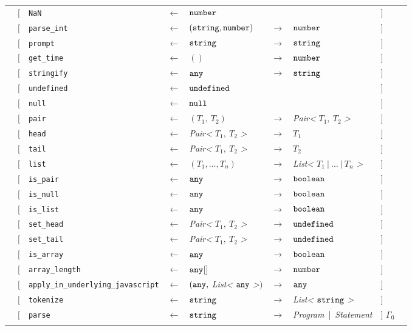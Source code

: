 \begin{tabular}[fragile]{lllllllll}
& $[$ & \texttt{NaN} & $\leftarrow$  & $\texttt{number}$ & & & $]$ \\
& $[$ & \texttt{parse\_int} & $\leftarrow$  & $(\texttt{string}, \texttt{number})$ & $\rightarrow$ & $\texttt{number}$ & $]$ \\
& $[$ & \texttt{prompt} & $\leftarrow$  & $\texttt{string}$ & $\rightarrow$ & $\texttt{string}$ & $]$ \\
& $[$ & \texttt{get\_time} & $\leftarrow$  & $()$ & $\rightarrow$ & $\texttt{number}$ & $]$ \\
& $[$ & \texttt{stringify} & $\leftarrow$  & $\texttt{any}$ & $\rightarrow$ & $\texttt{string}$ & $]$ \\
& $[$ & \texttt{undefined} & $\leftarrow$  & $\texttt{undefined}$ & & & $]$ \\
& $[$ & \texttt{null}      & $\leftarrow$  & $\texttt{null}$ & & & $]$ \\
& $[$ & \texttt{pair} & $\leftarrow$  & $(T_1,\ T_2)$ & $\rightarrow$ & \textit{Pair<} $T_1,\ T_2$ \textit{>} & $]$ \\
& $[$ & \texttt{head} & $\leftarrow$  & \textit{Pair<} $T_1,\ T_2$ \textit{>} & $\rightarrow$ & $T_1$ & $]$ \\
& $[$ & \texttt{tail} & $\leftarrow$  & \textit{Pair<} $T_1,\ T_2$ \textit{>} & $\rightarrow$ & $T_2$ & $]$ \\
& $[$ & \texttt{list} & $\leftarrow$  & $(T_1, \ldots, T_n)$ & $\rightarrow$ & \textit{List<} $T_1\ |\ \ldots\ |\ T_n$ \textit{>} & $]$ \\
& $[$ & \texttt{is\_pair} & $\leftarrow$  & $\texttt{any}$ & $\rightarrow$ & $\texttt{boolean}$ & $]$ \\
& $[$ & \texttt{is\_null} & $\leftarrow$  & $\texttt{any}$ & $\rightarrow$ & $\texttt{boolean}$ & $]$ \\
& $[$ & \texttt{is\_list} & $\leftarrow$  & $\texttt{any}$ & $\rightarrow$ & $\texttt{boolean}$ & $]$ \\
& $[$ & \texttt{set\_head} & $\leftarrow$  & \textit{Pair<} $T_1,\ T_2$ \textit{>} & $\rightarrow$ & $\texttt{undefined}$ & $]$ \\
& $[$ & \texttt{set\_tail} & $\leftarrow$  & \textit{Pair<} $T_1,\ T_2$ \textit{>} & $\rightarrow$ & $\texttt{undefined}$ & $]$ \\
& $[$ & \texttt{is\_array} & $\leftarrow$  & $\texttt{any}$ & $\rightarrow$ & $\texttt{boolean}$ & $]$ \\
& $[$ & \texttt{array\_length} & $\leftarrow$  & $\texttt{any}$[] & $\rightarrow$ & $\texttt{number}$ & $]$ \\
& $[$ & \texttt{apply\_in\_underlying\_javascript} & $\leftarrow$ & $(\texttt{any},$ \textit{List<} $\texttt{any}$ \textit{>}$)$ & $\rightarrow$ & $\texttt{any}$ & $]$ \\
& $[$ & \texttt{tokenize} & $\leftarrow$  & $\texttt{string}$ & $\rightarrow$ & \textit{List<} $\texttt{string}$ \textit{>} & $]$ \\
& $[$ & \texttt{parse} & $\leftarrow$  & $\texttt{string}$ & $\rightarrow$ & \textit{Program}\ |\ \textit{Statement} & $]$ $\Gamma_0$ \\
& \end{tabular}

